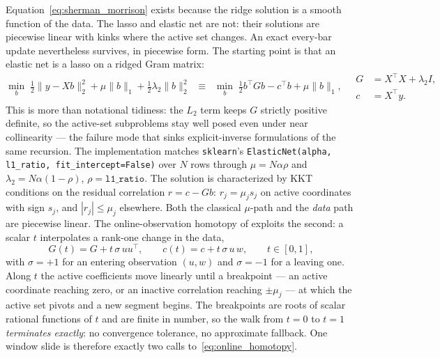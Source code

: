 Equation~\eqref{eq:sherman_morrison} exists because the ridge solution is a smooth
function of the data. The lasso \citep{Tibshirani1996} and elastic net
\citep{ZouHastie2005} are not: their solutions are piecewise linear with kinks
where the active set changes. An exact every-bar update nevertheless survives, in
piecewise form. The starting point is that an elastic net is a lasso on a ridged
Gram matrix:
\begin{equation}
\min_{b} \; \tfrac12 \|y - Xb\|_2^2 + \mu \|b\|_1 + \tfrac12 \lambda_2 \|b\|_2^2
\;\;\equiv\;\;
\min_{b} \; \tfrac12 b^\top G b - c^\top b + \mu \|b\|_1,
\quad
\begin{aligned}
G &= X^\top X + \lambda_2 I, \\ c &= X^\top y.
\end{aligned}
\label{eq:enet_gram}
\end{equation}
This is more than notational tidiness: the $L_2$ term keeps $G$ strictly positive
definite, so the active-set subproblems stay well posed even under near
collinearity --- the failure mode that sinks explicit-inverse formulations of the
same recursion. The implementation matches \texttt{sklearn}'s
\texttt{ElasticNet(alpha, l1\_ratio, fit\_intercept=False)} over $N$ rows through
$\mu = N \alpha \rho$ and $\lambda_2 = N \alpha (1-\rho)$, $\rho =
\texttt{l1\_ratio}$. The solution is characterized by KKT conditions on the
residual correlation $r = c - Gb$: $r_j = \mu_j s_j$ on active coordinates with
sign $s_j$, and $|r_j| \le \mu_j$ elsewhere. Both the classical $\mu$-path
\citep{Efron2004} and the \emph{data} path are piecewise linear. The
online-observation homotopy of \citet{Garrigues2008} exploits the second: a scalar
$t$ interpolates a rank-one change in the data,
\begin{equation}
G(t) = G + t\,\sigma\, u u^\top,
\qquad
c(t) = c + t\,\sigma\, u\, w,
\qquad t \in [0,1],
\label{eq:online_homotopy}
\end{equation}
with $\sigma = +1$ for an entering observation $(u,w)$ and $\sigma = -1$ for a
leaving one. Along $t$ the active coefficients move linearly until a breakpoint ---
an active coordinate reaching zero, or an inactive correlation reaching $\pm\mu_j$
--- at which the active set pivots and a new segment begins. The breakpoints are
roots of scalar rational functions of $t$ and are finite in number, so the walk
from $t=0$ to $t=1$ \emph{terminates exactly}: no convergence tolerance, no
approximate fallback. One window slide is therefore exactly two calls
to~\eqref{eq:online_homotopy}.

